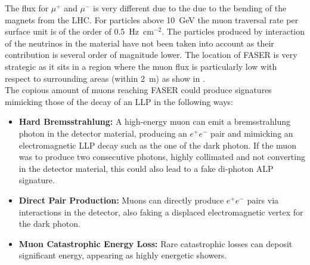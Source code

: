 			The flux for $\mu^+$ and $\mu^-$ is very different due to the due to the bending of the magnets from the LHC. For particles above \SI{10}{\giga\electronvolt} the muon traversal rate per surface unit is of the order of \SI{0.5}{\hertz\centi\meter}$^{-2}$. The particles produced by interaction of the neutrinos in the material have not been taken into account as their contribution is several order of magnitude lower. The location of FASER is very strategic as it sits in a region where the muon flux is particularly low with respect to surrounding areas (within \SI{2}{\meter}) as show in \cite{FASER_techprop}.\\

			The copious amount of muons reaching FASER could produce signatures mimicking those of the decay of an LLP in the following ways:  
			\begin{itemize}
    			\item \textbf{Hard Bremsstrahlung:} A high-energy muon can emit a bremsstrahlung photon in the detector material, producing an $e^+e^-$ pair and mimicking an electromagnetic LLP decay such as the one of the dark photon. If the muon was to produce two consecutive photons, highly collimated and not converting in the detector material, this could also lead to a fake di-photon ALP signature. 
    			\item \textbf{Direct Pair Production:} Muons can directly produce $e^+e^-$ pairs via interactions in the detector, also faking a displaced electromagnetic vertex for the dark photon.
    			\item \textbf{Muon Catastrophic Energy Loss:} Rare catastrophic losses can deposit significant energy, appearing as highly energetic showers.
			\end{itemize}
		

